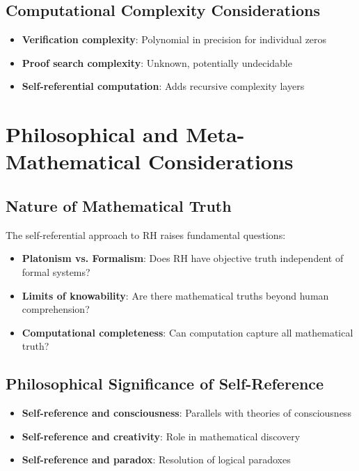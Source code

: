 \documentclass[12pt]{article}
\theoremstyle{plain}
\theoremstyle{definition}
\begin{document}
\subsection{Computational Complexity Considerations}

\begin{analysis}
\begin{itemize}
\item \textbf{Verification complexity}: Polynomial in precision for individual zeros
\item \textbf{Proof search complexity}: Unknown, potentially undecidable
\item \textbf{Self-referential computation}: Adds recursive complexity layers
\end{itemize}
\end{analysis}

\section{Philosophical and Meta-Mathematical Considerations}

\subsection{Nature of Mathematical Truth}

The self-referential approach to RH raises fundamental questions:

\begin{itemize}
\item \textbf{Platonism vs. Formalism}: Does RH have objective truth independent of formal systems?
\item \textbf{Limits of knowability}: Are there mathematical truths beyond human comprehension?
\item \textbf{Computational completeness}: Can computation capture all mathematical truth?
\end{itemize}

\subsection{Philosophical Significance of Self-Reference}

\begin{itemize}
\item \textbf{Self-reference and consciousness}: Parallels with theories of consciousness
\item \textbf{Self-reference and creativity}: Role in mathematical discovery
\item \textbf{Self-reference and paradox}: Resolution of logical paradoxes
\end{itemize}
\end{document}
